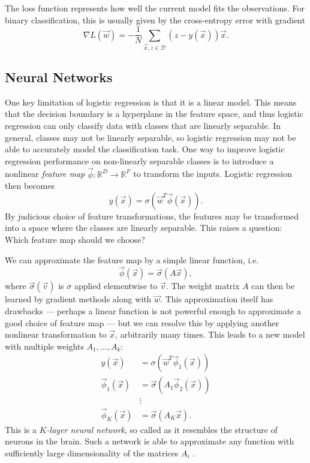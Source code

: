         The loss function represents how well the current model fits the
        observations. For binary classification, this is usually given by the
        cross-entropy error with gradient \citep{bishop06}
        \[
            \nabla L(\vec w) = -\frac{1}{N}
                \sum_{\vec x, z \in \mathcal D} \left(z - y(\vec x)\right) \vec x.
        \]

    \subsection{Neural Networks}
    \label{sec:neural-networks}

        One key limitation of logistic regression is that it is a linear model.
        This means that the decision boundary is a hyperplane in the feature
        space, and thus logistic regression can only classify data with classes
        that are linearly separable. In general, classes may not be linearly
        separable, so logistic regression may not be able to accurately model
        the classification task. One way to improve logistic regression
        performance on non-linearly separable classes is to introduce a
        nonlinear \emph{feature map} $\vec\phi : \mathbb{R}^D \to \mathbb{R}^F$
        to transform the inputs. Logistic regression then becomes
        \[
            y(\vec x) = \sigma(\vec w^T \vec\phi(\vec x)).
        \]
        By judicious choice of feature transformations, the features may be
        transformed into a space where the classes are linearly separable. This
        raises a question: Which feature map should we choose?

        We can approximate the feature map by a simple linear function, i.e.
        \[
            \vec\phi(\vec x) = \vec\sigma(A \vec x),
        \]
        where $\vec\sigma(\vec v)$ is $\sigma$ applied elementwise to $\vec v$.
        The weight matrix $A$ can then be learned by gradient methods along with
        $\vec w$. This approximation itself has drawbacks --- perhaps a linear
        function is not powerful enough to approximate a good choice of feature
        map --- but we can resolve this by applying another nonlinear
        transformation to $\vec x$, arbitrarily many times. This leads to a new
        model with multiple weights $A_1, \dots, A_k$:
        \begin{align*}
            y(\vec x) &= \sigma(\vec w^T \vec\phi_1(\vec x))\\
            \vec\phi_1(\vec x) &= \vec\sigma(A_1 \vec\phi_2(\vec x))\\
            &\vdots\\
            \vec\phi_K(\vec x) &= \vec\sigma(A_K \vec x).
        \end{align*}
        This is a \emph{$K$-layer neural network}, so called as it resembles
        the structure of neurons in the brain. Such a network is able to
        approximate any function with sufficiently large dimensionality of the
        matrices $A_i$ \citep{gybenko89}.

